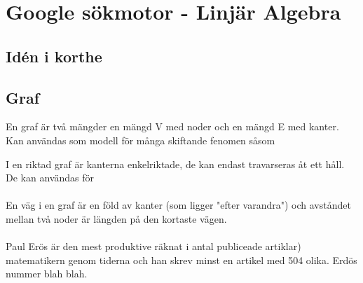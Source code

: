 \chapter{Google sökmotor - Linjär Algebra}

\section{Idén i korthe}

\section{Graf}
En graf är två mängder \textemdash en mängd V med noder och en mängd E med kanter.\\
Kan användas som modell för många skiftande fenomen såsom

I en riktad graf är kanterna enkelriktade, de kan endast travarseras åt ett håll.
De kan användas för
\\\\
En väg i en graf är en föld av kanter (som ligger "efter varandra") och avståndet mellan två noder är längden på den kortaste vägen.\\\\
Paul Erös är den mest produktive räknat i antal publiceade artiklar) matematikern genom tiderna och han skrev minst en artikel med 504 olika. Erdös nummer blah blah.
